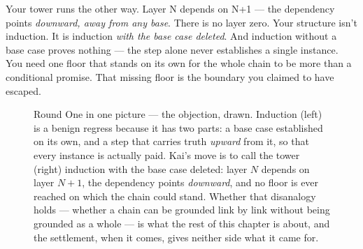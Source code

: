 \documentclass[fontsize=11pt,paper=a4,pagesize=auto,parskip=half-]{scrbook}
\begin{document}
Your tower runs the other way. Layer N depends on N+1 --- the dependency points \emph{downward, away from any base}. There is no layer zero. Your structure isn't induction. It is induction \emph{with the base case deleted}. And induction without a base case proves nothing --- the step alone never establishes a single instance. You need one floor that stands on its own for the whole chain to be more than a conditional promise. That missing floor is the boundary you claimed to have escaped.


\begin{figure}[htbp]
\centering
{}
\caption{Round One in one picture --- the objection, drawn. Induction (left) is a benign regress because it has two parts: a base case established on its own, and a step that carries truth \emph{upward} from it, so that every instance is actually paid. Kai's move is to call the tower (right) induction with the base case deleted: layer $N$ depends on layer $N{+}1$, the dependency points \emph{downward}, and no floor is ever reached on which the chain could stand. Whether that disanalogy holds --- whether a chain can be grounded link by link without being grounded as a whole --- is what the rest of this chapter is about, and the settlement, when it comes, gives neither side what it came for.}
\label{fig:induction}
\end{figure}
\end{document}
